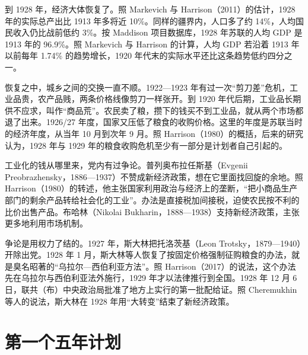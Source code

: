 到 1928 年，经济大体恢复了。照 Markevich 与 Harrison（2011）的估计，1928 年的实际总产出比 1913 年多将近 10\%\cite{markevich2011}。同样的疆界内，人口多了约 14\%，人均国民收入仍比战前低约 3\%\cite{markevich2011}。按 Maddison 项目数据库，1928 年苏联的人均 GDP 是 1913 年的 96.9\%\cite{mpd2023}。照 Markevich 与 Harrison 的计算，人均 GDP 若沿着 1913 年以前每年 1.74\% 的趋势增长，1920 年代末的实际水平还比这条趋势低约四分之一\cite{markevich2011}。

恢复之中，城乡之间的交换一直不顺。1922—1923 年有过一次“剪刀差”危机，工业品贵，农产品贱，两条价格线像剪刀一样张开\cite{harrison1980}。到 1920 年代后期，工业品长期供不应求，叫作“商品荒”\cite{harrison1980}。农民卖了粮，攒下的钱买不到工业品，就从两个市场都退了出来\cite{harrison1980}。1926/27 年度，国家又压低了粮食的收购价格\cite{harrison1980}。这里的年度是苏联当时的经济年度，从当年 10 月到次年 9 月\cite{markevich2011}。照 Harrison（1980）的概括，后来的研究认为，1928 年与 1929 年的粮食收购危机至少有一部分是计划者自己引起的\cite{harrison1980}。

工业化的钱从哪里来，党内有过争论。普列奥布拉任斯基（Evgenii Preobrazhensky，1886—1937）不赞成新经济政策，想在它里面找回旋的余地\cite{harrison1980,loc31}。照 Harrison（1980）的转述，他主张国家利用政治与经济上的垄断，“把小商品生产部门的剩余产品转给社会化的工业”\cite{harrison1980}。办法是直接税加间接税，迫使农民按不利的比价出售产品\cite{harrison1980}。布哈林（Nikolai Bukharin，1888—1938）支持新经济政策，主张更多地利用市场机制\cite{cggt2013,loc31}。

争论是用权力了结的。1927 年，斯大林把托洛茨基（Leon Trotsky，1879—1940）开除出党\cite{cggt2013,loc31}。1928 年 1 月，斯大林等人恢复了按固定价格强制征购粮食的办法，就是臭名昭著的“乌拉尔—西伯利亚方法”\cite{werth2016}。照 Harrison（2017）的说法，这个办法先在乌拉尔与西伯利亚法外施行，1929 年才以法律推行到全国\cite{harrison2017}。1928 年 12 月 6 日，联共（布）中央政治局批准了地方上实行的第一批配给证\cite{werth2016}。照 Cheremukhin 等人的说法，斯大林在 1928 年用“大转变”结束了新经济政策\cite{cggt2013}。

\section{第一个五年计划}\label{sec:soviet-plan}

